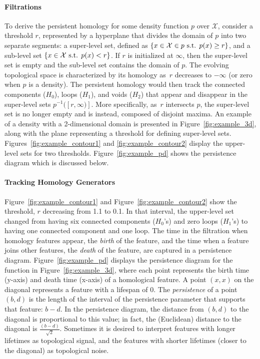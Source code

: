 \documentclass[12pt]{article}
\begin{document}
\paragraph{Filtrations}
To derive the persistent homology for some density function $p$ over $\mathcal X$, consider a threshold $r$, represented by a hyperplane that divides the domain of $p$ into two separate segments: a super-level set, defined as $\{ x \in \mathcal X \in p \textup{ s.t. } p(x) \geq r \}$, and a sub-level set $\{x \in \mathcal X \textup{ s.t. } p(x)  <  r \}$. If $r$ is initialized at $\infty$, then the super-level set is empty and the sub-level set contains the domain of $p$. The evolving topological space is characterized by its homology as~$r$ decreases to $-\infty$ (or zero when $p$ is a density). The persistent homology would then track the connected components ($H_{0}$), loops ($H_{1}$), and voids ($H_{2}$) that appear and disappear in the super-level sets $p^{-1}([r,\infty)]$. More specifically, as~$r$ intersects $p$, the super-level set is no longer empty and is instead, composed of disjoint maxima. An example of a density with a 2-dimensional domain is presented in Figure~\ref{fig:example_3d}, along with the plane representing a threshold for defining super-level sets.  Figures~\ref{fig:example_contour1} and \ref{fig:example_contour2} display the upper-level sets for two thresholds.  Figure~\ref{fig:example_pd} shows the persistence diagram which is discussed below.


\paragraph{Tracking Homology Generators}
Figure~\ref{fig:example_contour1} and Figure~\ref{fig:example_contour2} show the threshold, $r$ decreasing from 1.1 to 0.1. In that interval, the upper-level set changed from having six connected components ($H_0$'s) and zero loops ($H_1$'s) to having one connected component and one loop. The time in the filtration when homology features appear, the \emph{birth} of the feature, and the time when a feature joins other features, the \emph{death} of the feature, are captured in a persistence diagram. Figure~\ref{fig:example_pd} displays the persistence diagram for the function in Figure~\ref{fig:example_3d}, where each point represents the birth time (y-axis) and death time (x-axis) of a homological feature. A point $(x,x)$ on the diagonal represents a feature with a lifespan of 0.  The \emph{persistence} of a point $(b,d)$ is the length of the interval of the persistence parameter that supports that feature: $b - d$. In the persistence diagram, the distance from $(b,d)$ to the diagonal is proportional to this value; in fact, the (Euclidean) distance to the diagonal is $\frac{(b-d)}{\sqrt{2}}$.
Sometimes it is desired to interpret features with longer lifetimes as topological signal, and the features with shorter lifetimes (closer to the diagonal) as topological noise.
\end{document}
